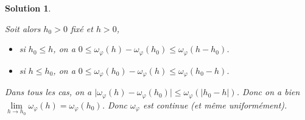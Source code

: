 \documentclass[12pt]{article}
\newtheorem{solution}{Solution}[section]
\theoremstyle{remark}
\numberwithin{equation}{section}
\begin{document}
\begin{solution}
\begin{enumerate}
		Soit alors $h_{0}>0$ fixé et $h>0$,
		\begin{itemize}
			\item si $h_{0}\leqslant h$, on a $0\leqslant\omega_\varphi(h)-\omega_\varphi(h_0)\leqslant\omega_\varphi(h-h_0)$.
			\item si $h\leqslant h_{0}$, on a $0\leqslant\omega_\varphi(h_0)-\omega_\varphi(h)\leqslant\omega_\varphi(h_0-h)$.
		\end{itemize}
		Dans tous les cas, on a $\vert\omega_\varphi(h)-\omega_\varphi(h_{0})\vert\leqslant\omega_\varphi(\vert h_{0}-h\vert)$. Donc on a bien $\lim\limits_{h\to h_{0}}\omega_\varphi(h)=\omega_\varphi(h_{0})$. Donc $\omega_{\varphi}$ est continue (et même uniformément).
	\end{enumerate}
\end{solution}
\end{document}
